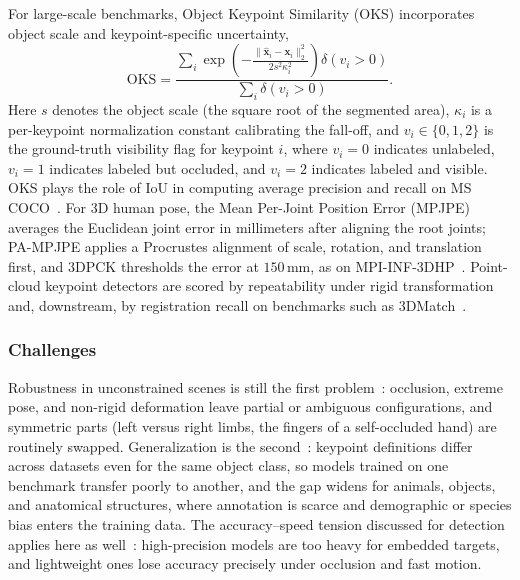 For large-scale benchmarks, Object Keypoint Similarity (OKS) incorporates object scale and keypoint-specific uncertainty,
\begin{equation}
\mathrm{OKS} =
\frac{\sum_i \exp\!\left( -\frac{\lVert \hat{\mathbf{x}}_i - \mathbf{x}_i \rVert_2^2}{2 s^2 \kappa_i^2} \right)\delta(v_i > 0)}
{\sum_i \delta(v_i > 0)}.
\end{equation}
Here $s$ denotes the object scale (the square root of the segmented area), $\kappa_i$ is a per-keypoint normalization constant calibrating the fall-off, and $v_i \in \{0, 1, 2\}$ is the ground-truth visibility flag for keypoint $i$, where $v_i = 0$ indicates unlabeled, $v_i = 1$ indicates labeled but occluded, and $v_i = 2$ indicates labeled and visible.
OKS plays the role of IoU in computing average precision and recall on MS COCO~\cite{lin2014microsoft}. For 3D human pose, the Mean Per-Joint Position Error (MPJPE) averages the Euclidean joint error in millimeters after aligning the root joints; PA-MPJPE applies a Procrustes alignment of scale, rotation, and translation first, and 3DPCK thresholds the error at $150$\,mm, as on MPI-INF-3DHP~\cite{mehta2017monocular}. Point-cloud keypoint detectors are scored by repeatability under rigid transformation and, downstream, by registration recall on benchmarks such as 3DMatch~\cite{zeng20173dmatch}.

\subsubsection{Challenges}
Robustness in unconstrained scenes is still the first problem~\cite{fisal2025reported, guo2025survey}: occlusion, extreme pose, and non-rigid deformation leave partial or ambiguous configurations, and symmetric parts (left versus right limbs, the fingers of a self-occluded hand) are routinely swapped.
Generalization is the second~\cite{kappan2026survey, ma20252d, jiang2022animal}: keypoint definitions differ across datasets even for the same object class, so models trained on one benchmark transfer poorly to another, and the gap widens for animals, objects, and anatomical structures, where annotation is scarce and demographic or species bias enters the training data.
The accuracy--speed tension discussed for detection applies here as well~\cite{khabarlak2021fast, alvarez2021real}: high-precision models are too heavy for embedded targets, and lightweight ones lose accuracy precisely under occlusion and fast motion.




